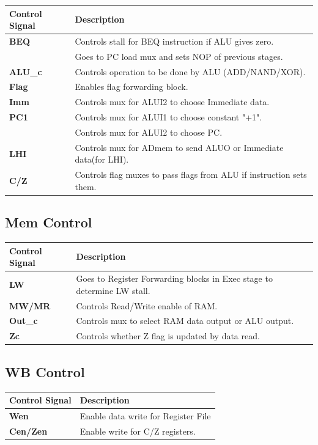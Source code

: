 \documentclass{article}
\begin{document}
\begin{tabular}{|l|l|}
\hline
\textbf{Control Signal} & \textbf{Description}\\
\hline
\textbf{BEQ} & Controls stall for BEQ instruction if ALU gives zero.\\
             & Goes to PC load mux and sets NOP of previous stages.\\
\hline
\textbf{ALU\_c} & Controls operation to be done by ALU (ADD/NAND/XOR).\\
\hline
\textbf{Flag} & Enables flag forwarding block.\\
\hline
\textbf{Imm} & Controls mux for ALUI2 to choose Immediate data.\\
\hline
\textbf{PC1} & Controls mux for ALUI1 to choose constant "+1".\\
             & Controls mux for ALUI2 to choose PC.\\
\hline
\textbf{LHI} & Controls mux for ADmem to send ALUO or Immediate data(for LHI).\\
\hline
\textbf{C/Z} & Controls flag muxes to pass flags from ALU if instruction sets them.\\

\hline
\end{tabular}


\subsection*{Mem Control}

\begin{tabular}{|l|l|}
\hline
\textbf{Control Signal} & \textbf{Description}\\
\hline
\textbf{LW} & Goes to Register Forwarding blocks in Exec stage to determine LW stall.\\
\hline
\textbf{MW/MR} & Controls Read/Write enable of RAM.\\
\hline
\textbf{Out\_c} & Controls mux to select RAM data output or ALU output.\\
\hline
\textbf{Zc} & Controls whether Z flag is updated by data read.\\
\hline
\end{tabular}

\subsection*{WB Control}

\begin{tabular}{|l|l|}
\hline
\textbf{Control Signal} & \textbf{Description}\\
\hline
\textbf{Wen} & Enable data write for Register File\\
\hline
\textbf{Cen/Zen} & Enable write for C/Z registers.\\
\hline
\end{tabular}
\end{document}
